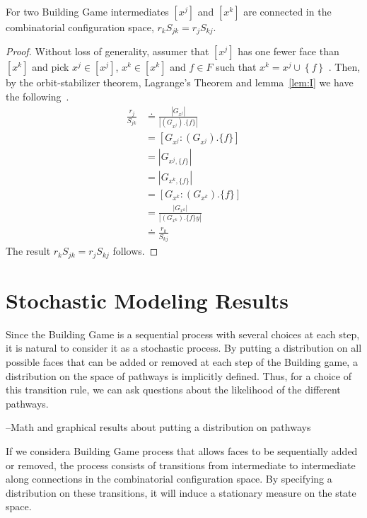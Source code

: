 \begin{mythm}
\label{thm:J}
For two Building Game intermediates $[x^j]$ and $[x^k]$ are connected in the combinatorial configuration space, $r_kS_{jk} = r_jS_{kj}$.
\end{mythm}
\begin{proof}
Without loss of generality, assumer that $[x^j]$ has one fewer face than $[x^k]$ and pick $x^j \in [x^j]$, $x^k \in [x^k]$ and $f \in F$ such that $x^k = x^j \cup \left\{f\right\}$ . Then, by the orbit-stabilizer theorem, Lagrange's Theorem and lemma~\ref{lem:I} we have the following~\cite{Rotman1995}.
\begin{align}
\frac{r_j}{S_{jk}} &\doteq \frac{\left|G_{x^j}\right|}{\left|\left(G_{x^j}\right).\{f\}\right|} \\
                   &= \left[G_{x^j} : \left(G_{x^j}\right).\{f\} \right] \\
                   &= \left|G_{x^j,\{f\}}\right| \\
                   &= \left|G_{x^k,\{f\}}\right| \\
                   &= \left[G_{x^k} : \left(G_{x^k}\right).\{f\} \right] \\
                   &= \frac{\left|G_{x^k}\right|}{\left|\left(G_{x^k}\right).\{f\}y\right|} \\
                   &\doteq \frac{r_k}{S_{kj}} 
\end{align}
The result $r_kS_{jk} = r_jS_{kj}$ follows.
\end{proof}


\section{Stochastic Modeling Results}

Since the Building Game is a sequential process with several choices at each step, it is natural to consider it as a stochastic process. By putting a distribution on all possible faces that can be added or removed at each step of the Building game, a distribution on the space of pathways is implicitly defined. Thus, for a choice of this transition rule, we can ask questions about the likelihood of the different pathways. 

--Math and graphical results about putting a distribution on pathways


If we considera Building Game process that allows faces to be sequentially added or removed, the process consists of transitions from intermediate to intermediate along connections in the combinatorial configuration space. By specifying a distribution on these transitions, it will induce a stationary measure on the state space.  

